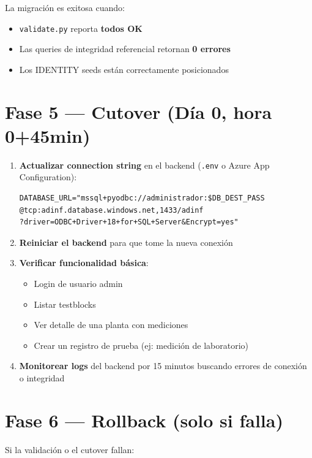 \documentclass[12pt,a4paper,twoside]{report}
\begin{document}
\begin{successbox}
La migraci\'on es exitosa cuando:
\begin{itemize}[noitemsep]
    \item \texttt{validate.py} reporta \textbf{todos OK}
    \item Las queries de integridad referencial retornan \textbf{0 errores}
    \item Los IDENTITY seeds est\'an correctamente posicionados
\end{itemize}
\end{successbox}

\section{Fase 5 --- Cutover (D\'ia 0, hora 0+45min)}

\begin{enumerate}
    \item \textbf{Actualizar connection string} en el backend (\texttt{.env} o Azure App Configuration):
\begin{lstlisting}[style=bashstyle]
DATABASE_URL="mssql+pyodbc://administrador:$DB_DEST_PASS
@tcp:adinf.database.windows.net,1433/adinf
?driver=ODBC+Driver+18+for+SQL+Server&Encrypt=yes"
\end{lstlisting}
    \item \textbf{Reiniciar el backend} para que tome la nueva conexi\'on
    \item \textbf{Verificar funcionalidad b\'asica}:
    \begin{itemize}[noitemsep]
        \item Login de usuario admin
        \item Listar testblocks
        \item Ver detalle de una planta con mediciones
        \item Crear un registro de prueba (ej: medici\'on de laboratorio)
    \end{itemize}
    \item \textbf{Monitorear logs} del backend por 15 minutos buscando errores de conexi\'on o integridad
\end{enumerate}

\section{Fase 6 --- Rollback (solo si falla)}

Si la validaci\'on o el cutover fallan:
\end{document}
